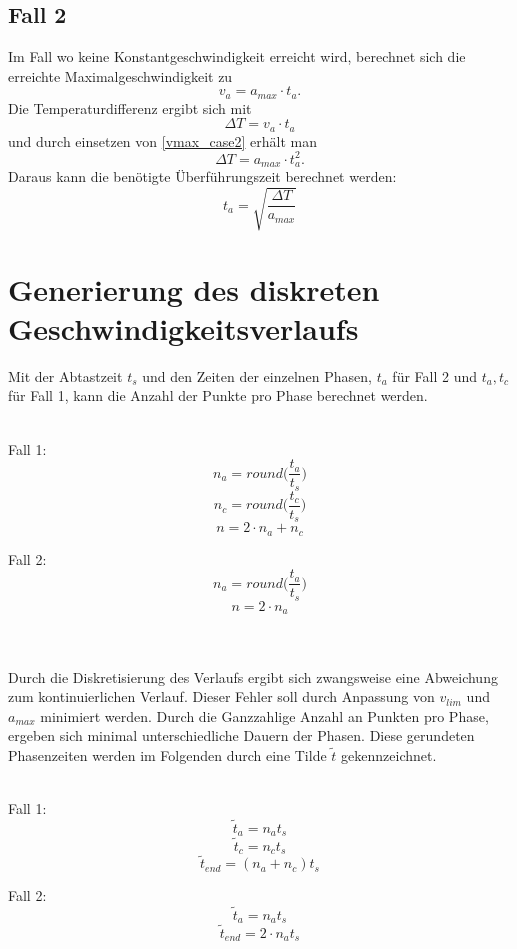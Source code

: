 \documentclass[a4paper, 10pt]{scrartcl}
\begin{document}
			
		\subsection{Fall 2}
			Im Fall wo keine Konstantgeschwindigkeit erreicht wird, berechnet sich die erreichte Maximalgeschwindigkeit zu
			\begin{equation}
				v_{a} = a_{max}\cdot t_{a}.
				\label{vmax_case2}
			\end{equation}
			Die Temperaturdifferenz ergibt sich mit
			\[\Delta T = v_{a}\cdot t_{a}\]
			und durch einsetzen von \eqref{vmax_case2} erhält man
			\[\Delta T = a_{max}\cdot t_{a}^{2}.\]
			Daraus kann die benötigte Überführungszeit berechnet werden:
			\[t_{a} = \sqrt{\frac{\Delta T}{a_{max}}} \]
			
	\section{Generierung des diskreten Geschwindigkeitsverlaufs}	
		Mit der Abtastzeit $ t_{s} $ und den Zeiten der einzelnen Phasen, $ t_{a} $ für Fall 2 und $ t_{a},t_{c} $ für Fall 1, kann die Anzahl der Punkte pro Phase berechnet werden.\\\\
		
		\begin{minipage}{0.45\textwidth}
			Fall 1:
			\[n_{a} = round\bigg(\frac{t_{a}}{t_{s}}\bigg)\]
			\[n_{c} = round\bigg(\frac{t_{c}}{t_{s}}\bigg)\]
			\[n = 2\cdot n_{a} + n_{c}\]
		\end{minipage}%
		\hfill
		\begin{minipage}{0.45\textwidth}
			Fall 2:
			\[n_{a} = round\bigg(\frac{t_{a}}{t_{s}}\bigg)\]
			\[n = 2\cdot n_{a}\]
		\end{minipage}\\\\
	
		Durch die Diskretisierung des Verlaufs ergibt sich zwangsweise eine Abweichung zum kontinuierlichen Verlauf. Dieser Fehler soll durch Anpassung von $ v_{lim}$ und $a_{max} $ minimiert werden. Durch die Ganzzahlige Anzahl an Punkten pro Phase, ergeben sich minimal unterschiedliche Dauern der Phasen. Diese gerundeten Phasenzeiten werden im Folgenden durch eine Tilde $ \tilde{t} $ gekennzeichnet. \\\\
		
		\begin{minipage}{0.45\textwidth}
			Fall 1:
			\[\tilde{t}_{a} = n_{a}t_{s}\]
			\[\tilde{t}_{c} = n_{c}t_{s}\]
			\[\tilde{t}_{end} = (n_{a}+n_{c})t_{s}\]
		\end{minipage}%
		\hfill
		\begin{minipage}{0.45\textwidth}
			Fall 2:
			\[\tilde{t}_{a} = n_{a}t_{s}\]
			\[\tilde{t}_{end} = 2\cdot n_{a}t_{s}\]
		\end{minipage}\\\\
	
\end{document}
